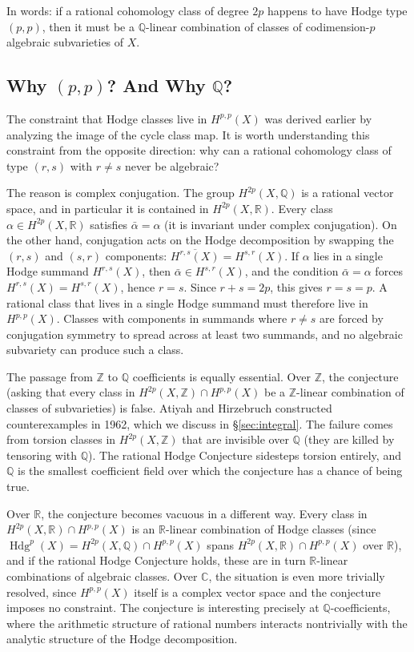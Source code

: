 \documentclass{article}
\newcommand{\C}{\mathbb{C}}
\newcommand{\Q}{\mathbb{Q}}
\newcommand{\R}{\mathbb{R}}
\newcommand{\Z}{{\mathbb{Z}}}
\begin{document}
In words: if a rational cohomology class of degree $2p$ happens to have Hodge
type $(p,p)$, then it must be a $\Q$-linear combination of classes of
codimension-$p$ algebraic subvarieties of $X$.

\subsection{Why $(p,p)$? And Why $\Q$?}\label{subsec:whypp}

The constraint that Hodge classes live in $H^{p,p}(X)$ was derived earlier by analyzing the image of the cycle class map. It
is worth understanding this constraint from the opposite direction: why can a
rational cohomology class of type $(r,s)$ with $r \neq s$ never be algebraic?

The reason is complex conjugation. The group $H^{2p}(X, \Q)$ is a rational
vector space, and in particular it is contained in $H^{2p}(X, \R)$. Every
class $\alpha \in H^{2p}(X, \R)$ satisfies $\bar\alpha = \alpha$ (it is
invariant under complex conjugation). On the other hand, conjugation acts on
the Hodge decomposition by swapping the $(r,s)$ and $(s,r)$ components:
$\overline{H^{r,s}(X)} = H^{s,r}(X)$. If $\alpha$ lies in a single Hodge
summand $H^{r,s}(X)$, then $\bar\alpha \in H^{s,r}(X)$, and the condition
$\bar\alpha = \alpha$ forces $H^{r,s}(X) = H^{s,r}(X)$, hence $r = s$. Since
$r + s = 2p$, this gives $r = s = p$. A rational class that lives in a single
Hodge summand must therefore live in $H^{p,p}(X)$. Classes with components in
summands where $r \neq s$ are forced by conjugation symmetry to spread across
at least two summands, and no algebraic subvariety can produce such a class.

The passage from $\Z$ to $\Q$ coefficients is equally essential. Over $\Z$, the
conjecture (asking that every class in $H^{2p}(X, \Z) \cap H^{p,p}(X)$ be a
$\Z$-linear combination of classes of subvarieties) is false. Atiyah and
Hirzebruch constructed counterexamples in 1962, which we discuss in
\S\ref{sec:integral}. The failure comes from torsion classes in
$H^{2p}(X, \Z)$ that are invisible over $\Q$ (they are killed by tensoring
with $\Q$). The rational Hodge Conjecture sidesteps torsion entirely, and
$\Q$ is the smallest coefficient field over which the conjecture has a chance
of being true.

Over $\R$, the conjecture becomes vacuous in a different way. Every class in
$H^{2p}(X, \R) \cap H^{p,p}(X)$ is an $\R$-linear combination of Hodge
classes (since $\operatorname{Hdg}^p(X) = H^{2p}(X, \Q) \cap H^{p,p}(X)$
spans $H^{2p}(X, \R) \cap H^{p,p}(X)$ over $\R$), and if the rational Hodge
Conjecture holds, these are in turn $\R$-linear combinations of algebraic
classes. Over $\C$, the situation is even more trivially resolved, since
$H^{p,p}(X)$ itself is a complex vector space and the conjecture imposes no
constraint. The conjecture is interesting precisely at $\Q$-coefficients,
where the arithmetic structure of rational numbers interacts nontrivially with
the analytic structure of the Hodge decomposition.
\end{document}
